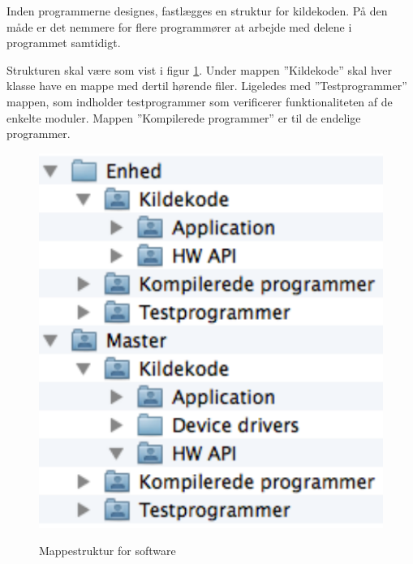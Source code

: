 
Inden programmerne designes, fastlægges en struktur for kildekoden. På den måde er det nemmere for flere programmører at arbejde med delene i programmet samtidigt.

Strukturen skal være som vist i figur \ref{fig:implementationview}. Under mappen ''Kildekode'' skal hver klasse have en mappe med dertil hørende filer. Ligeledes med ''Testprogrammer'' mappen, som indholder testprogrammer som verificerer funktionaliteten af de enkelte moduler.
Mappen ''Kompilerede programmer'' er til de endelige programmer.

\begin{figure}[htbp] \centering
{\includegraphics[scale=0.7]{filer/pics/SW-Implementation-View}}
\caption{Mappestruktur for software}
\label{fig:implementationview}
\end{figure}